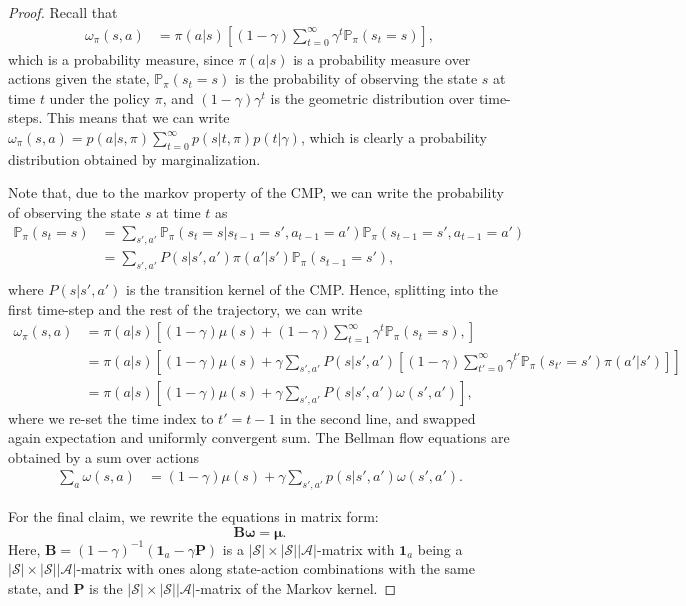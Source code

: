 \documentclass{article}
\theoremstyle{plain}
\theoremstyle{definition}
\theoremstyle{remark}
\newcommand{\sS}{\mathcal{S}}
\newcommand{\sA}{\mathcal{A}}
\begin{document}
\begin{proof}
    Recall that
\begin{align*}
    \omega_\pi(s,a) &= \pi(a|s)\left[(1-\gamma)\sum_{t=0}^\infty \gamma^t \mathbb{P}_\pi (s_t = s)\right],
\end{align*}
which is a probability measure, since $\pi(a|s)$ is a probability measure over actions given the state, $\mathbb{P}_\pi (s_t = s)$ is the probability of observing the state $s$ at time $t$ under the policy $\pi$, and $(1-\gamma)\gamma^t$ is the geometric distribution over time-steps.
This means that we can write $\omega_\pi(s,a) = p(a|s,\pi) \sum_{t=0}^{\infty} p(s|t,\pi) p(t|\gamma)$, which is clearly a probability distribution obtained by marginalization.

Note that, due to the markov property of the CMP, we can write the probability of observing the state $s$ at time $t$ as
\begin{align*}
    \mathbb{P}_\pi (s_t = s) &= \sum_{s',a'}\mathbb{P}_\pi (s_t = s|s_{t-1} = s', a_{t-1}=a')\mathbb{P}_\pi (s_{t-1} = s', a_{t-1}=a')\\
    &= \sum_{s',a'}P(s|s',a')\pi(a'|s')\mathbb{P}_\pi (s_{t-1} = s'),\\
\end{align*}
where $P(s|s',a')$ is the transition kernel of the CMP.
Hence, splitting into the first time-step and the rest of the trajectory, we can write
\begin{align*}
    \omega_\pi(s,a) &= \pi(a|s)\left[(1-\gamma)\mu(s) + (1-\gamma)\sum_{t=1}^\infty \gamma^t \mathbb{P}_\pi (s_t = s),\right]\\
    &= \pi(a|s)\left[(1-\gamma) \mu(s) + \gamma \sum_{s',a'}P(s|s',a')\left[(1-\gamma)\sum_{t'=0}^\infty \gamma^{t'}\mathbb{P}_\pi (s_{t'} = s')\pi(a'|s')\right]\right]\\
    &= \pi(a|s)\left[(1-\gamma)\mu(s) + \gamma \sum_{s',a'}P(s|s',a')\omega(s',a')\right],
\end{align*}
where we re-set the time index to $t'=t-1$ in the second line, and swapped again expectation and uniformly convergent sum.
The Bellman flow equations are obtained by a sum over actions
\begin{align*}
   \sum_a \omega(s,a) &= (1-\gamma)\mu(s) + \gamma \sum_{s',a'}p(s|s',a')\omega(s',a').
\end{align*}

For the final claim, we rewrite the equations in matrix form:
\begin{equation}
    \boldsymbol{B}\boldsymbol{\omega} = \boldsymbol{\mu}.
\end{equation}
Here, $\boldsymbol{B} = (1-\gamma)^{-1}(\boldsymbol{1}_{a}-\gamma\boldsymbol{P})$ is a $|\sS|\times|\sS||\sA|$-matrix with $\boldsymbol{1}_{a}$ being a $|\sS|\times|\sS||\sA|$-matrix with ones along state-action combinations with the same state, and $\boldsymbol{P}$ is the $|\sS|\times|\sS||\sA|$-matrix of the Markov kernel.
\end{proof}
\end{document}
